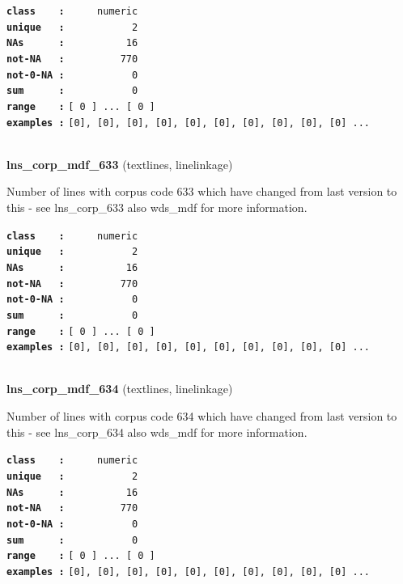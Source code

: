 \documentclass[]{article}
\begin{document}
\textbf{\texttt{class\ \ \ \ :}} \texttt{~~~~~numeric}\\
\textbf{\texttt{unique\ \ \ :}} \texttt{~~~~~~~~~~~2}\\
\textbf{\texttt{NAs\ \ \ \ \ \ :}} \texttt{~~~~~~~~~~16}\\
\textbf{\texttt{not-NA\ \ \ :}} \texttt{~~~~~~~~~770}\\
\textbf{\texttt{not-0-NA\ :}} \texttt{~~~~~~~~~~~0}\\
\textbf{\texttt{sum\ \ \ \ \ \ :}} \texttt{~~~~~~~~~~~0}\\
\textbf{\texttt{range\ \ \ \ :}}
\texttt{{[}\ 0\ {]}\ ...\ {[}\ 0\ {]}}\\
\textbf{\texttt{examples\ :}}
\texttt{{[}0{]},\ {[}0{]},\ {[}0{]},\ {[}0{]},\ {[}0{]},\ {[}0{]},\ {[}0{]},\ {[}0{]},\ {[}0{]},\ {[}0{]}\ ...}\\

~

\textbf{lns\_corp\_mdf\_633} (textlines, linelinkage)

Number of lines with corpus code 633 which have changed from last
version to this - see lns\_corp\_633 also wds\_mdf for more information.

\textbf{\texttt{class\ \ \ \ :}} \texttt{~~~~~numeric}\\
\textbf{\texttt{unique\ \ \ :}} \texttt{~~~~~~~~~~~2}\\
\textbf{\texttt{NAs\ \ \ \ \ \ :}} \texttt{~~~~~~~~~~16}\\
\textbf{\texttt{not-NA\ \ \ :}} \texttt{~~~~~~~~~770}\\
\textbf{\texttt{not-0-NA\ :}} \texttt{~~~~~~~~~~~0}\\
\textbf{\texttt{sum\ \ \ \ \ \ :}} \texttt{~~~~~~~~~~~0}\\
\textbf{\texttt{range\ \ \ \ :}}
\texttt{{[}\ 0\ {]}\ ...\ {[}\ 0\ {]}}\\
\textbf{\texttt{examples\ :}}
\texttt{{[}0{]},\ {[}0{]},\ {[}0{]},\ {[}0{]},\ {[}0{]},\ {[}0{]},\ {[}0{]},\ {[}0{]},\ {[}0{]},\ {[}0{]}\ ...}\\

~

\textbf{lns\_corp\_mdf\_634} (textlines, linelinkage)

Number of lines with corpus code 634 which have changed from last
version to this - see lns\_corp\_634 also wds\_mdf for more information.

\textbf{\texttt{class\ \ \ \ :}} \texttt{~~~~~numeric}\\
\textbf{\texttt{unique\ \ \ :}} \texttt{~~~~~~~~~~~2}\\
\textbf{\texttt{NAs\ \ \ \ \ \ :}} \texttt{~~~~~~~~~~16}\\
\textbf{\texttt{not-NA\ \ \ :}} \texttt{~~~~~~~~~770}\\
\textbf{\texttt{not-0-NA\ :}} \texttt{~~~~~~~~~~~0}\\
\textbf{\texttt{sum\ \ \ \ \ \ :}} \texttt{~~~~~~~~~~~0}\\
\textbf{\texttt{range\ \ \ \ :}}
\texttt{{[}\ 0\ {]}\ ...\ {[}\ 0\ {]}}\\
\textbf{\texttt{examples\ :}}
\texttt{{[}0{]},\ {[}0{]},\ {[}0{]},\ {[}0{]},\ {[}0{]},\ {[}0{]},\ {[}0{]},\ {[}0{]},\ {[}0{]},\ {[}0{]}\ ...}\\
\end{document}
